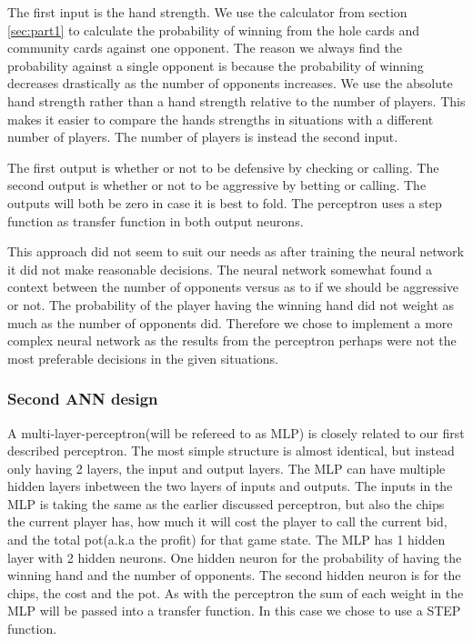 The first input is the hand strength. We use the calculator from section \ref{sec:part1} to calculate the probability of winning from the hole cards and community cards against one opponent. The reason we always find the probability against a single opponent is because the probability of winning decreases drastically as the number of opponents increases. We use the absolute hand strength rather than a hand strength relative to the number of players. 
This makes it easier to compare the hands strengths in situations with a different number of players. The number of players is instead the second input.

The first output is whether or not to be defensive by checking or calling. The second output is whether or not to be aggressive by betting or calling. The outputs will both be zero in case it is best to fold. 
The perceptron uses a step function as transfer function in both output neurons.



This approach did not seem to suit our needs as after training the neural network it did not make reasonable decisions. The neural network somewhat found a context between the number of opponents versus as to if we should be aggressive or not. The probability of the player having the winning hand did not weight as much as the number of opponents did. Therefore we chose to implement a more complex neural network as the results from the perceptron perhaps were not the most preferable decisions in the given situations.\\

\subsubsection{Second ANN design}
A multi-layer-perceptron(will be refereed to as MLP) is closely related to our first described perceptron. The most simple structure is almost identical, but instead only having 2 layers, the input and output layers. The MLP can have multiple hidden layers inbetween the two layers of inputs and outputs.
The inputs in the MLP is taking the same as the earlier discussed perceptron, but also the chips the current player has, how much it will cost the player to call the current bid, and the total pot(a.k.a the profit) for that game state.
The MLP has 1 hidden layer with 2 hidden neurons. One hidden neuron for the probability of having the winning hand and the number of opponents. The second hidden neuron is for the chips, the cost and the pot.
As with the perceptron the sum of each weight in the MLP will be passed into a transfer function. In this case we chose to use a STEP function.

